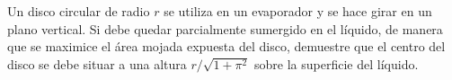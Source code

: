 \item Un disco circular de radio $r$ se utiliza en un evaporador y se hace girar en un plano vertical. Si debe quedar parcialmente sumergido en el líquido, de manera que se maximice el área mojada expuesta del disco, demuestre que el centro del disco se debe situar a una altura $r/\sqrt{1 + \pi^2}$ sobre la superficie del líquido.
